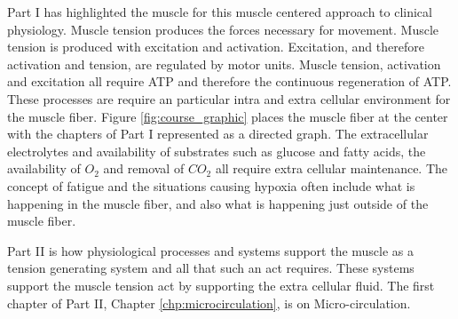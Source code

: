Part I has highlighted the muscle for this muscle centered approach to clinical physiology. Muscle tension produces the forces necessary for movement. Muscle tension is produced with excitation and activation. Excitation, and therefore activation and tension, are regulated by motor units. Muscle tension, activation and excitation all require ATP and therefore the continuous regeneration of ATP. These processes are require an particular intra and extra cellular environment for the muscle fiber. Figure \ref{fig:course_graphic} places the muscle fiber at the center with the chapters of Part I represented as a directed graph. The extracellular electrolytes and availability of substrates such as glucose and fatty acids, the availability of $O_2$ and removal of $CO_2$ all require extra cellular maintenance. The concept of fatigue and the situations causing hypoxia often include what is happening in the muscle fiber, and also what is happening just outside of the muscle fiber. 



Part II is how physiological processes and systems support the muscle as a tension generating system and all that such an act requires. These systems support the muscle tension act by supporting the extra cellular fluid. The first chapter of Part II, Chapter \ref{chp:microcirculation}, is on Micro-circulation. 

\printbibliography[heading=subbibintoc]